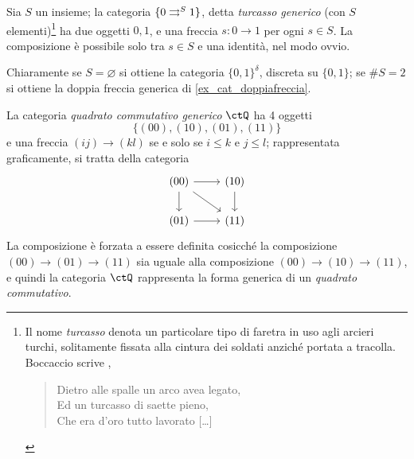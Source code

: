 \begin{example}\label{ex_cat_turcasso}
	Sia \(S\) un insieme; la categoria \(\turk\), detta \emph{turcasso generico} (con \(S\) elementi)\footnote{Il nome \emph{turcasso} denota un particolare tipo di faretra in uso agli arcieri turchi, solitamente fissata alla cintura dei soldati anziché portata a tracolla. Boccaccio scrive \cite{boccaccio1831teseide},
		\begin{verse}
			Dietro alle spalle un arco avea legato,\\
			Ed un turcasso di saette pieno,\\
			Che era d'oro tutto lavorato [\dots\unkern]
		\end{verse}} ha due oggetti \(0,1\), e una freccia \(s : 0\to 1\) per ogni \(s\in S\). La composizione è possibile solo tra \(s\in S\) e una identità, nel modo ovvio.

	Chiaramente se \(S=\varnothing\) si ottiene la categoria \(\{0,1\}^\delta\), discreta su \(\{0,1\}\); se \(\#S=2\) si ottiene la doppia freccia generica di \ref{ex_cat_doppiafreccia}.
\end{example}
\begin{example}\label{ex_quadcuboncubo}
	La categoria \emph{quadrato commutativo generico} \(\ctQ\) ha 4 oggetti
	\[\{(00),(10),(01),(11)\} \]
	e una freccia \((ij)\to(kl)\) se e solo se \(i\le k\) e \(j\le l\); rappresentata graficamente, si tratta della categoria
	\[\begin{tikzcd}
			(00) \ar[r]\ar[d]\ar[dr]& (10)\ar[d] \\
			(01) \ar[r]& (11)
		\end{tikzcd}\]
	La composizione è forzata a essere definita cosicché la composizione \((00)\to (01)\to (11)\) sia uguale alla composizione \((00)\to (10)\to (11)\), e quindi la categoria \(\ctQ\) rappresenta la forma generica di un \emph{quadrato commutativo}.
\end{example}
